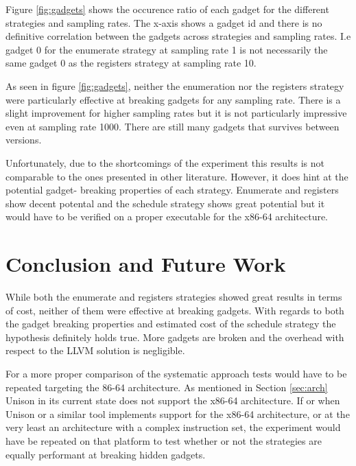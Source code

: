 Figure \ref{fig:gadgets} shows the occurence ratio of each gadget for the different
strategies and sampling rates. The x-axis shows a gadget id and there is no definitive
correlation between the gadgets across strategies and sampling rates. I.e gadget 0 for the
enumerate strategy at sampling rate 1 is not necessarily the same gadget 0 as the registers
strategy at sampling rate 10.

As seen in figure \ref{fig:gadgets}, neither the enumeration nor the registers strategy
were particularly effective at breaking gadgets for any sampling rate. There is a slight
improvement for higher sampling rates but it is not particularly impressive even at
sampling rate 1000. There are still many gadgets that survives between versions.

Unfortunately, due to the shortcomings of the experiment this results is not comparable to
the ones presented in other literature. However, it does hint at the potential gadget-
breaking properties of each strategy. Enumerate and registers show decent potental and the
schedule strategy shows great potential but it would have to be verified on a proper
executable for the x86-64 architecture.

\section{Conclusion and Future Work}


While both the enumerate and registers strategies showed great results in terms of cost,
neither of them were effective at breaking gadgets. With regards to both the gadget
breaking properties and estimated cost of the schedule strategy the hypothesis definitely
holds true. More gadgets are broken and the overhead with respect to the LLVM solution
is negligible.

For a more proper comparison of the systematic approach tests would have to be repeated
targeting the 86-64 architecture. As mentioned in Section \ref{sec:arch} Unison in its
current state does not support the x86-64 architecture. If or when Unison or a similar
tool implements support for the x86-64 architecture, or at the very least an architecture
with a complex instruction set, the experiment would have be repeated on that platform to
test whether or not the strategies are equally performant at breaking hidden gadgets.

